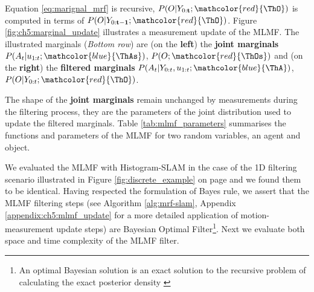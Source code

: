 Equation \ref{eq:marignal_mrf} is recursive, $P(O|Y_{0:\mathbf{t}};\mathcolor{red}{\ThO})$ is computed in terms of $P(O|Y_{0:\mathbf{t-1}};\mathcolor{red}{\ThO})$. 
Figure \ref{fig:ch5:marginal_update} illustrates a measurement update of the MLMF.  The illustrated marginals (\textit{Bottom row}) are 
(on the \textbf{left}) the \textbf{joint marginals} $P(A_t|u_{1:t};\mathcolor{blue}{\ThAs})$, $P(O;\mathcolor{red}{\ThOs})$ and (on the \textbf{right}) the \textbf{filtered marginals} $P(A_t|Y_{0:t},u_{1:t};\mathcolor{blue}{\ThA})$, $P(O|Y_{0:t};\mathcolor{red}{\ThO})$. 


The shape of the \textbf{joint marginals} remain unchanged by measurements during the filtering process, they are the parameters of the joint distribution used to update the filtered marginals. 
Table \ref{tab:mlmf_parameters} summarises the functions and parameters of the MLMF for two random variables, an agent and object.

\begin{table}[h]
\centering
{}
\caption{MLMF functions with associated parameters. The marginal parameters are the discretisation of the 
state space $\boldsymbol{\theta} \in \mathbb{R}^N$, $\boldsymbol{\theta}^{(s)}$ correspond to the probability being in state $s$.}
\label{tab:mlmf_parameters}
\end{table}

We evaluated the MLMF with Histogram-SLAM in the case of the 1D filtering scenario
illustrated in Figure \ref{fig:discrete_example} on page \pageref{fig:discrete_example} and we found them to be identical. Having respected the formulation of Bayes rule, we
assert that the MLMF filtering steps (see  Algorithm \ref{alg:mrf-slam}, Appendix \ref{appendix:ch5:mlmf_update} for a more detailed application of motion-measurement update steps) are 
Bayesian Optimal Filter\footnote{An optimal Bayesian solution is an exact solution to the recursive problem of calculating the exact posterior density \cite{PF_tutorial_2002}}. 
Next we evaluate both space and time complexity of the MLMF filter.

